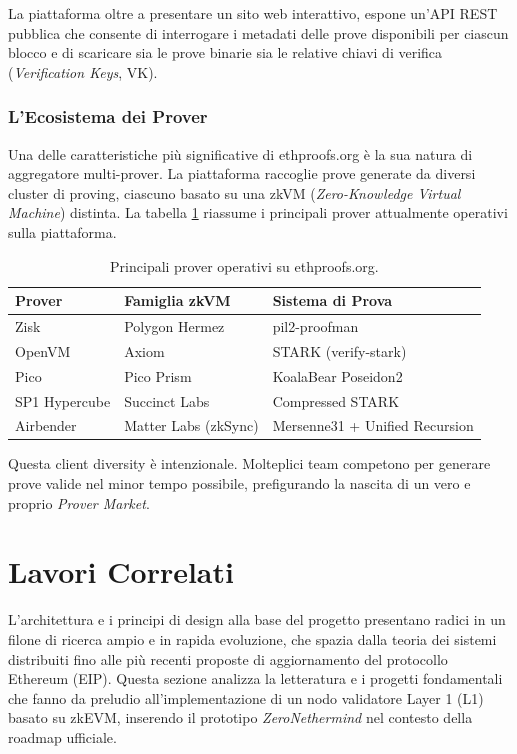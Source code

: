 \documentclass[12pt,a4paper,openright,twoside]{report}
\begin{document}
La piattaforma oltre a presentare un sito web interattivo, espone un'API REST pubblica che consente di interrogare i metadati delle prove disponibili per ciascun blocco e di scaricare sia le prove binarie sia le relative chiavi di verifica (\textit{Verification Keys}, VK).

\subsubsection{L'Ecosistema dei Prover}

Una delle caratteristiche più significative di ethproofs.org è la sua natura di aggregatore multi-prover. La piattaforma raccoglie prove generate da diversi cluster di proving, ciascuno basato su una zkVM (\textit{Zero-Knowledge Virtual Machine}) distinta. La tabella \ref{tab:provers} riassume i principali prover attualmente operativi sulla piattaforma.

\begin{table}[H]
\centering
\begin{tabular}{l l l}
\hline
\textbf{Prover} & \textbf{Famiglia zkVM} & \textbf{Sistema di Prova} \\
\hline
Zisk & Polygon Hermez & pil2-proofman \\
OpenVM & Axiom & STARK (verify-stark) \\
Pico & Pico Prism & KoalaBear Poseidon2 \\
SP1 Hypercube & Succinct Labs & Compressed STARK \\
Airbender & Matter Labs (zkSync) & Mersenne31 + Unified Recursion \\
\hline
\end{tabular}
\caption{Principali prover operativi su ethproofs.org.}
\label{tab:provers}
\end{table}

Questa client diversity è intenzionale. Molteplici team competono per generare prove valide nel minor tempo possibile, prefigurando la nascita di un vero e proprio \textit{Prover Market}\cite{prover_market}. 

\section{Lavori Correlati}

L'architettura e i principi di design alla base del progetto presentano radici in un filone di ricerca ampio e in rapida evoluzione, che spazia dalla teoria dei sistemi distribuiti fino alle più recenti proposte di aggiornamento del protocollo Ethereum (EIP). Questa sezione analizza la letteratura e i progetti fondamentali che fanno da preludio all'implementazione di un nodo validatore Layer 1 (L1) basato su zkEVM, inserendo il prototipo \textit{ZeroNethermind} nel contesto della roadmap ufficiale.
\end{document}
